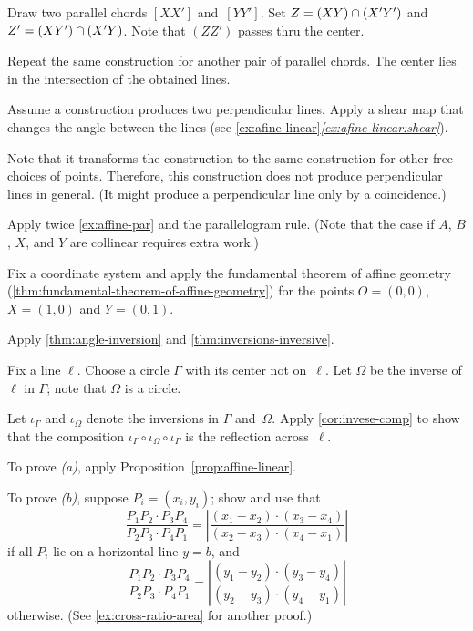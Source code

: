 Draw two parallel chords $[XX']$ and~$[YY']$.
Set $Z\z=(XY)\z\cap (X'Y')$ and $Z'\z= (XY')\cap (X'Y)$.
Note that $(ZZ')$ passes thru the center.

Repeat the same construction for another pair of parallel chords.
The center lies in the intersection of the obtained lines.

Assume a construction produces two perpendicular lines.
Apply a shear map that changes the angle between the lines (see \ref{ex:afine-linear}\textit{\ref{ex:afine-linear:shear}}).

Note that it transforms the construction to the same construction for other free choices of points.
Therefore, this construction does not produce perpendicular lines in general.
(It might produce a perpendicular line only by a coincidence.)
 
Apply twice \ref{ex:affine-par} and the parallelogram rule.
(Note that the case if $A$, $B$, $X$, and $Y$ are collinear requires extra work.)
 
Fix a coordinate system and apply the fundamental theorem of affine geometry (\ref{thm:fundamental-theorem-of-affine-geometry}) for the points $O=(0,0)$, $X=(1,0)$ and $Y=(0,1)$.
 
Apply \ref{thm:angle-inversion} and \ref{thm:inversions-inversive}.
 
Fix a line $\ell$.
Choose a circle $\Gamma$ with its center not on~$\ell$.
Let $\Omega$ be the inverse of $\ell$ in $\Gamma$;
note that $\Omega$ is a circle.

Let $\iota_\Gamma$ and $\iota_\Omega$ denote the inversions in $\Gamma$ and~$\Omega$.
Apply \ref{cor:invese-comp} to show that the composition 
$\iota_\Gamma\circ\iota_\Omega\circ\iota_\Gamma$
is the reflection across~$\ell$.

\setcounter{eqtn}{0}

To prove \textit{(a)}, apply Proposition~\ref{prop:affine-linear}.

To prove \textit{(b)}, suppose $P_i=(x_i,y_i)$;
show and use that 
\[\frac{P_1P_2\cdot P_3P_4}{P_2P_3\cdot P_4P_1}
=\left|\frac{(x_1-x_2)\cdot(x_3-x_4)}{(x_2-x_3)\cdot (x_4-x_1)}\right|\]
if all $P_i$ lie on a horizontal line $y=b$, and
\[\frac{P_1P_2\cdot P_3P_4}{P_2P_3\cdot P_4P_1}
=\left|\frac{(y_1-y_2)\cdot(y_3-y_4)}{(y_2-y_3)\cdot (y_4-y_1)}\right|\]
otherwise. (See \ref{ex:cross-ratio-area} for another proof.)


